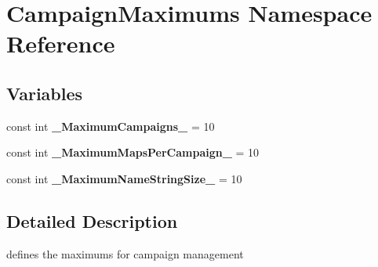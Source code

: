 \hypertarget{namespace_campaign_maximums}{}\section{Campaign\+Maximums Namespace Reference}
\label{namespace_campaign_maximums}
\subsection*{Variables}
\begin{DoxyCompactItemize}
\item 
\hypertarget{namespace_campaign_maximums_a4afc7337be7d65590322a534053f87b5}{}\label{namespace_campaign_maximums_a4afc7337be7d65590322a534053f87b5} 
const int {\bfseries \+\_\+\+Maximum\+Campaigns\+\_\+} = 10
\item 
\hypertarget{namespace_campaign_maximums_aef4536ddbf2a3ad4501e9d404a6742e2}{}\label{namespace_campaign_maximums_aef4536ddbf2a3ad4501e9d404a6742e2} 
const int {\bfseries \+\_\+\+Maximum\+Maps\+Per\+Campaign\+\_\+} = 10
\item 
\hypertarget{namespace_campaign_maximums_a93c182187cc471f8c1c7230d81c0e2a9}{}\label{namespace_campaign_maximums_a93c182187cc471f8c1c7230d81c0e2a9} 
const int {\bfseries \+\_\+\+Maximum\+Name\+String\+Size\+\_\+} = 10
\end{DoxyCompactItemize}


\subsection{Detailed Description}
defines the maximums for campaign management 